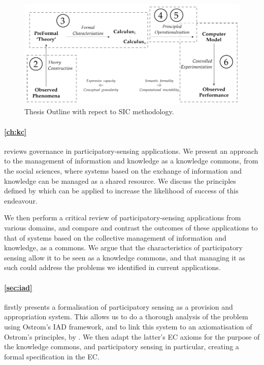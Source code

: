 \begin{figure}
\includegraphics[width=\linewidth]{gfx/intro/sic_chapters}
\caption{Thesis Outline with repect to \acl{SIC} methodology.}\label{fig:sicoutline}
\end{figure}

\paragraph{\autoref{ch:kc}}
reviews governance in participatory-sensing
applications. We present an approach to the management of information and knowledge as a knowledge commons, from
the social sciences, where systems based on the exchange of
information and knowledge can be managed as a shared resource. We discuss the
principles defined by \citet{Ostrom1990} which can be applied to increase the
likelihood of success of this endeavour. 

We then perform a critical review of participatory-sensing applications from
various domains, and compare and contrast the outcomes of these applications
to that of systems based on the collective management of information and
knowledge, as a commons. We argue that the characteristics of participatory
sensing allow it to be seen as a knowledge commons, and that managing it as such
could address the problems we identified in current applications.

\paragraph{\autoref{sec:iad}}
firstly presents a formalisation of participatory sensing as a provision and
appropriation system. This allows us to do a thorough
analysis of the problem using Ostrom's \ac{IAD} framework, and to link this
system to an axiomatisation of Ostrom's principles, by \citet{Pitt2012b}.
We then adapt the latter's \ac{EC} axioms for the purpose of the
knowledge commons, and participatory sensing in particular, creating a formal specification in the \ac{EC}.

